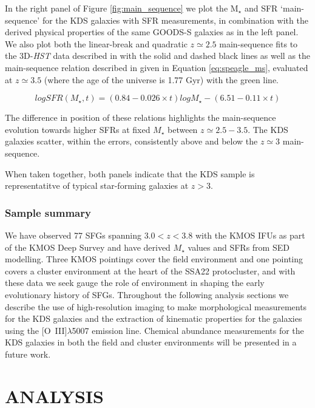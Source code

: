 \documentclass[fleqn,usenatbib]{mnras}
\begin{document}
In the right panel of Figure \ref{fig:main_sequence} we plot the M$_{\star}$ and SFR `main-sequence' for the KDS galaxies with SFR measurements, in combination with the derived physical properties of the same GOODS-S galaxies as in the left panel.
We also plot both the linear-break and quadratic $z\simeq2.5$ main-sequence fits to the 3D-{\em HST} data described in \cite{Whitaker2014} with the solid and dashed black lines as well as the main-sequence relation described in \cite{Speagle2014} given in Equation \ref{eq:speagle_ms}, evaluated at $z\simeq3.5$ (where the age of the universe is 1.77 Gyr) with the green line.

\begin{equation}\label{eq:speagle_ms}
logSFR(M_{\star}, t) = (0.84 - 0.026 \times t)logM_{\star} - (6.51 - 0.11 \times t)
\end{equation}

\noindent
The difference in position of these relations highlights the main-sequence evolution towards higher SFRs at fixed $M_{\star}$ between $z\simeq2.5-3.5$.
The KDS galaxies scatter, within the errors, consistently above and below the $z\simeq3$ main-sequence.

When taken together, both panels indicate that the KDS sample is representatitve of typical star-forming galaxies at $z>3$.

\subsubsection{Sample summary}\label{subsubsec:sample_summary}
We have observed 77 SFGs spanning $3.0 < z < 3.8$ with the KMOS IFUs as part of the KMOS Deep Survey and have derived $M_{\star}$ values and SFRs from SED modelling.
Three KMOS pointings cover the field environment and one pointing covers a cluster environment at the heart of the SSA22 protocluster, and with these data we seek gauge the role of environment in shaping the early evolutionary history of SFGs.
Throughout the following analysis sections we describe the use of high-resolution imaging to make morphological measurements for the KDS galaxies and the extraction of kinematic properties for the galaxies using the [O~{\sc III}]$\lambda$5007 emission line.
Chemical abundance measurements for the KDS galaxies in both the field and cluster environments will be presented in a future work.

\section{ANALYSIS}\label{sec:analysis}
\end{document}

